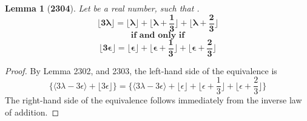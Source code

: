 \documentclass[preview]{standalone}
\newtheorem*{lemma*}{Lemma}
\begin{document}
\begin{lemma*}[\textbf{2304}]
    Let \bm{$\lambda$} be a real number, 
    such that \bm{$\big \lfloor \lambda \big \rfloor + \epsilon = \lambda$}.
    \begin{equation*}
        \bm{
            \bigg \lfloor 3 \lambda \bigg \rfloor
                =
            \bigg \lfloor \lambda \bigg \rfloor 
                + 
            \bigg \lfloor \lambda + \frac{1}{3} \bigg \rfloor 
                + 
            \bigg \lfloor \lambda + \frac{2}{3} \bigg \rfloor
        }
    \end{equation*}
    \begin{equation*}
        \textbf{if and only if}
    \end{equation*}
    \begin{equation*}
        \bm{
            \bigg \lfloor 3 \epsilon \bigg \rfloor
                =
            \bigg \lfloor \epsilon \bigg \rfloor 
                + 
            \bigg \lfloor \epsilon + \frac{1}{3} \bigg \rfloor 
                + 
            \bigg \lfloor \epsilon + \frac{2}{3} \bigg \rfloor
        }
    \end{equation*}
\end{lemma*}

\begin{proof}
    By Lemma 2302, and 2303, the left-hand side of the equivalence is
    \begin{equation*}
        \Bigg\{
            \bigg \langle 
                3 \lambda - 3 \epsilon 
            \bigg \rangle
                +
            \bigg \lfloor 3 \epsilon \bigg \rfloor
        \Bigg\}
            =
        \Bigg\{
            \bigg \langle 3 \lambda - 3 \epsilon \bigg \rangle
                + 
            \bigg \lfloor \epsilon \bigg \rfloor 
                + 
            \bigg \lfloor \epsilon + \frac{1}{3} \bigg \rfloor 
                + 
            \bigg \lfloor \epsilon + \frac{2}{3} \bigg \rfloor
        \Bigg\}
    \end{equation*}
    The right-hand side of the equivalence follows immediately 
    from the inverse law of addition.
\color{lightgray} \end{proof}
\end{document}
